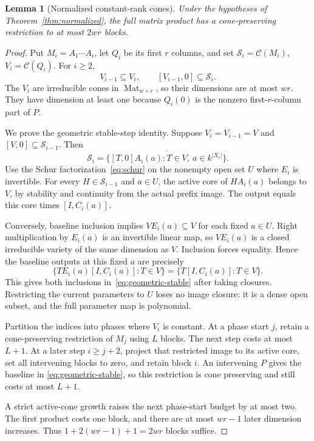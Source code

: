 \documentclass[11pt]{article}
\newtheorem{lemma}[theorem]{Lemma}
\theoremstyle{definition}\newtheorem{definition}[theorem]{Definition}
\theoremstyle{remark}\newtheorem{remark}[theorem]{Remark}
\newcommand{\Mat}{\operatorname{Mat}}
\begin{document}
\begin{lemma}[Normalized constant-rank cones]\label{lem:cone-normalized}
Under the hypotheses of Theorem~\ref{thm:normalized}, the full matrix
product has a cone-preserving restriction to at most $2wr$ blocks.
\end{lemma}
\begin{proof}
Put $M_i=A_1\cdots A_i$, let $Q_i$ be its first $r$ columns, and set
$\mathcal S_i=\mathcal C(M_i)$, $V_i=\mathcal C(Q_i)$. For $i\ge2$,
\[
 V_{i-1}\subseteq V_i,\qquad [V_{i-1},0]\subseteq\mathcal S_i.
\]
The $V_i$ are irreducible cones in $\Mat_{w\times r}$, so their dimensions
are at most $wr$. They have dimension at least one because $Q_i(0)$ is
the nonzero first-$r$-column part of $P$.

We prove the geometric stable-step identity. Suppose
$V_i=V_{i-1}=V$ and $[V,0]\subseteq\mathcal S_{i-1}$. Then
\begin{equation}\label{eq:geometric-stable}
 \mathcal S_i=
 \overline{\{[T,0]A_i(a):T\in V,\ a\in k^{|X_i|}\}}.
\end{equation}
Use the Schur factorization~\eqref{eq:schur} on the nonempty open set
$U$ where $E_i$ is invertible. For every $H\in\mathcal S_{i-1}$ and
$a\in U$, the active core of $HA_i(a)$ belongs to $V$, by stability
and continuity from the actual prefix image. The output equals this
core times $[I,C_i(a)]$.

Conversely, baseline inclusion implies $VE_i(a)\subseteq V$ for each
fixed $a\in U$. Right multiplication by $E_i(a)$ is an invertible
linear map, so $VE_i(a)$ is a closed irreducible variety of the same
dimension as $V$. Inclusion forces equality. Hence the baseline outputs
at this fixed $a$ are precisely
\[
 \{TE_i(a)[I,C_i(a)]:T\in V\}
   =\{T[I,C_i(a)]:T\in V\}.
\]
This gives both inclusions in~\eqref{eq:geometric-stable} after taking
closures. Restricting the current parameters to $U$ loses no image closure:
it is a dense open subset, and the full parameter map is polynomial.

Partition the indices into phases where $V_i$ is constant. At a phase
start $j$, retain a cone-preserving restriction of $M_j$ using $L$ blocks.
The next step costs at most $L+1$. At a later step $i\ge j+2$, project
that restricted image to its active core, set all intervening blocks to
zero, and retain block $i$. An intervening $P$ gives the baseline in
\eqref{eq:geometric-stable}, so this restriction is cone preserving and
still costs at most $L+1$.

A strict active-cone growth raises the next phase-start budget by at
most two. The first product costs one block, and there are at most
$wr-1$ later dimension increases. Thus $1+2(wr-1)+1=2wr$ blocks suffice.
\end{proof}
\end{document}
